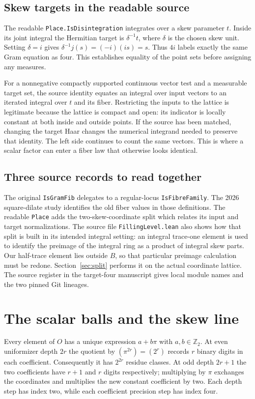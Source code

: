 \documentclass[12pt,letterpaper]{article}
\newcommand{\id}[1]{{\small\nolinkurl{#1}}}
\begin{document}
\subsection{Skew targets in the readable source}
The readable \id{Place.IsDisintegration} integrates over a skew parameter $t$. Inside its joint integral the Hermitian target is $\delta^{-1}t$, where $\delta$ is the chosen skew unit. Setting $\delta=i$ gives $\delta^{-1}j(s)=(-i)(is)=s$. Thus $4i$ labels exactly the same Gram equation as four. This establishes equality of the point sets before assigning any measures.

For a nonnegative compactly supported continuous vector test and a measurable target set, the source identity equates an integral over input vectors to an iterated integral over $t$ and its fiber. Restricting the inputs to the lattice is legitimate because the lattice is compact and open: its indicator is locally constant at both inside and outside points. If the source has been matched, changing the target Haar changes the numerical integrand needed to preserve that identity. The left side continues to count the same vectors. This is where a scalar factor can enter a fiber law that otherwise looks identical.

\subsection{Three source records to read together}
The original \id{IsGramFib} delegates to a regular-locus \id{IsFibreFamily}. The 2026 square-dilate study identifies the old fiber values in those definitions. The readable \id{Place} adds the two-skew-coordinate split which relates its input and target normalizations. The source file \id{FillingLevel.lean} also shows how that split is built in its intended integral setting: an integral trace-one element is used to identify the preimage of the integral ring as a product of integral skew parts. Our half-trace element lies outside $B$, so that particular preimage calculation must be redone. Section~\ref{sec:split} performs it on the actual coordinate lattice. The source register in the target-four manuscript gives local module names and the two pinned Git lineages.

\section{The scalar balls and the skew line}
Every element of $O$ has a unique expression $a+b\pi$ with $a,b\in\mathbb Z_2$. At even uniformizer depth $2r$ the quotient by $(\pi^{2r})=(2^r)$ records $r$ binary digits in each coefficient. Consequently it has $2^{2r}$ residue classes. At odd depth $2r+1$ the two coefficients have $r+1$ and $r$ digits respectively; multiplying by $\pi$ exchanges the coordinates and multiplies the new constant coefficient by two. Each depth step has index two, while each coefficient precision step has index four.
\end{document}
